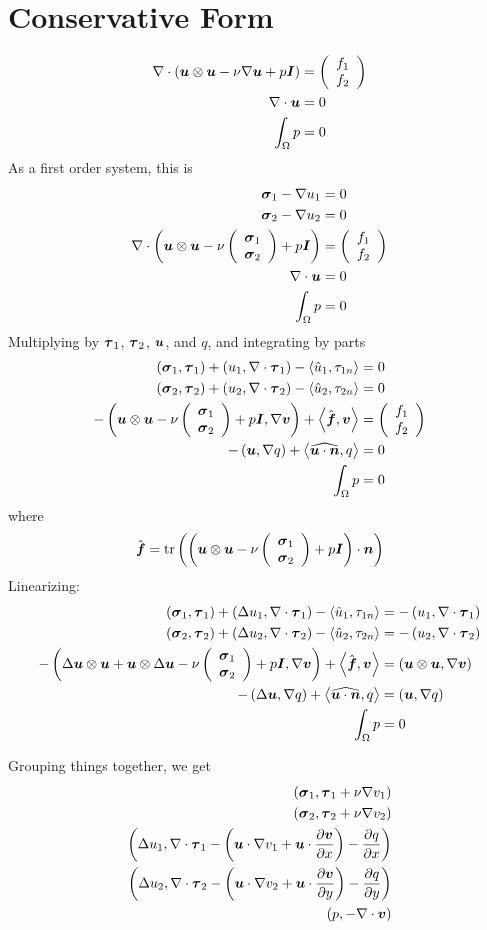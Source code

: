 \documentclass{article}
\begin{document}
\section*{Conservative Form}
\begin{align*}
  \Div\LRp{\bfu\otimes\bfu-\nu\Grad\bfu+p\bfI}&=\vecttwo{f_1}{f_2}\\
  \Div\bfu&=0\\
  \int_\Omega p&=0
\end{align*}
As a first order system, this is
\begin{align*}
  \bfsigma_1-\Grad u_1&=0\\
  \bfsigma_2-\Grad u_2&=0\\
  \Div\LRp{\bfu\otimes\bfu-\nu\vecttwo{\bfsigma_1}{\bfsigma_2}+p\bfI}&=\vecttwo{f_1}{f_2}\\
  \Div\bfu&=0\\
  \int_\Omega p&=0
\end{align*}
Multiplying by $\bftau_1$, $\bftau_2$, $\bfu$, and $q$, and integrating by
parts
\begin{align*}
  \LRp{\bfsigma_1,\bftau_1}
  +\LRp{u_1,\Div\bftau_1}
  -\LRa{\hat u_1,\tau_{1n}}&=0\\
  \LRp{\bfsigma_2,\bftau_2}
  +\LRp{u_2,\Div\bftau_2}
  -\LRa{\hat u_2,\tau_{2n}}&=0\\
  -\LRp{\bfu\otimes\bfu-\nu\vecttwo{\bfsigma_1}{\bfsigma_2}+p\bfI,\Grad\bfv}
  +\LRa{\hat\bff,\bfv}
  &=\vecttwo{f_1}{f_2}\\
  -\LRp{\bfu,\Grad q}
  +\LRa{\widehat{\bfu\cdot\bfn},q}&=0\\
  \int_\Omega p&=0
\end{align*}
where
\[
\hat\bff=\trace\LRp{\LRp{\bfu\otimes\bfu-\nu\vecttwo{\bfsigma_1}{\bfsigma_2}+p\bfI}\cdot\bfn}
\]
Linearizing:
\begin{align*}
  \LRp{\bfsigma_1,\bftau_1}
  +\LRp{\Delta u_1,\Div\bftau_1}
  -\LRa{\hat u_1,\tau_{1n}}
  &=-\LRp{u_1,\Div\bftau_1}
  \\
  \LRp{\bfsigma_2,\bftau_2}
  +\LRp{\Delta u_2,\Div\bftau_2}
  -\LRa{\hat u_2,\tau_{2n}}
  &=-\LRp{u_2,\Div\bftau_2}
  \\
  -\LRp{\Delta\bfu\otimes\bfu+\bfu\otimes\Delta\bfu-\nu\vecttwo{\bfsigma_1}{\bfsigma_2}+p\bfI,\Grad\bfv}
  +\LRa{\hat\bff,\bfv}
  &=\LRp{\bfu\otimes\bfu,\Grad\bfv}
  \\
  -\LRp{\Delta\bfu,\Grad q}
  +\LRa{\widehat{\bfu\cdot\bfn},q}
  &=\LRp{\bfu,\Grad q}
  \\
  \int_\Omega p&=0
\end{align*}

Grouping things together, we get
\begin{align*}
  \LRp{\bfsigma_1,\bftau_1+\nu\Grad v_1}\\
  \LRp{\bfsigma_2,\bftau_2+\nu\Grad v_2}\\
  \LRp{\Delta u_1,\Div\bftau_1
  -\LRp{\bfu\cdot\Grad v_1
  +\bfu\cdot\frac{\partial\bfv}{\partial x}}
  -\frac{\partial q}{\partial x}}\\
  \LRp{\Delta u_2,\Div\bftau_2
  -\LRp{\bfu\cdot\Grad v_2
  +\bfu\cdot\frac{\partial\bfv}{\partial y}}
  -\frac{\partial q}{\partial y}}\\
  \LRp{p,-\Div\bfv}
\end{align*}
\end{document}
